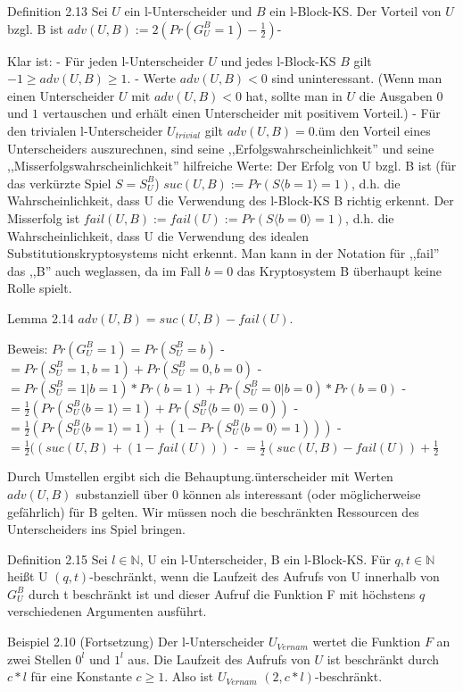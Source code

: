 \documentclass[a4paper]{article}
\begin{document}
\begin{multicols}{3}
    Definition 2.13 Sei $U$ ein l-Unterscheider und $B$ ein l-Block-KS. Der Vorteil von $U$ bzgl. B ist $adv(U,B):= 2(Pr(G^B_U=1)-\frac{1}{2})$-

    Klar ist:
    - Für jeden l-Unterscheider $U$ und jedes l-Block-KS $B$ gilt $-1\geq adv(U,B)\geq 1$.
    - Werte $adv(U,B)<0$ sind uninteressant. (Wenn man einen Unterscheider $U$ mit $adv(U,B)<0$ hat, sollte man in $U$ die Ausgaben $0$ und $1$ vertauschen und erhält einen Unterscheider mit positivem Vorteil.)
    - Für den trivialen l-Unterscheider $U_{trivial}$ gilt $adv(U,B) = 0$.üm den Vorteil eines Unterscheiders auszurechnen, sind seine ,,Erfolgswahrscheinlichkeit'' und seine ,,Misserfolgswahrscheinlichkeit'' hilfreiche Werte: Der Erfolg von U bzgl. B ist (für das verkürzte Spiel $S=S_U^B$) $suc(U,B) := Pr(S\langle b= 1\rangle = 1)$, d.h. die Wahrscheinlichkeit, dass U die Verwendung des l-Block-KS B richtig erkennt. Der Misserfolg ist $fail(U,B) := fail(U) := Pr(S\langle b= 0\rangle = 1)$, d.h. die Wahrscheinlichkeit, dass U die Verwendung des idealen Substitutionskryptosystems nicht erkennt. Man kann in der Notation für ,,fail'' das ,,B'' auch weglassen, da im Fall $b=0$ das Kryptosystem B überhaupt keine Rolle spielt.

    Lemma 2.14 $adv(U,B) = suc(U,B)-fail(U)$.

    Beweis: $Pr(G^B_U= 1) = Pr(S_U^B=b)$
    - $= Pr(S_U^B= 1,b= 1) + Pr(S_U^B= 0,b= 0)$
    - $= Pr(S_U^B= 1|b= 1)* Pr(b= 1) + Pr(S^B_U= 0|b= 0)*Pr(b= 0)$
    - $=\frac{1}{2}( Pr(S_U^B\langle b= 1\rangle = 1) + Pr(S_U^B\langle b= 0\rangle = 0))$
    - $=\frac{1}{2}( Pr(S_U^B\langle b= 1\rangle = 1) + (1-Pr(S_U^B\langle b= 0\rangle = 1)))$
    - $=\frac{1}{2}( (suc(U,B) + (1-fail(U)))$
    - $=\frac{1}{2}(suc(U,B)-fail(U)) + \frac{1}{2}$

    Durch Umstellen ergibt sich die Behauptung.ünterscheider mit Werten $adv(U,B)$ substanziell über 0 können als interessant (oder möglicherweise gefährlich) für B gelten. Wir müssen noch die beschränkten Ressourcen des Unterscheiders ins Spiel bringen.

    Definition 2.15 Sei $l\in\mathbb{N}$, U ein l-Unterscheider, B ein l-Block-KS. Für $q,t\in\mathbb{N}$ heißt U $(q,t)$-beschränkt, wenn die Laufzeit des Aufrufs von U innerhalb von $G^B_U$ durch t beschränkt ist und dieser Aufruf die Funktion F mit höchstens $q$ verschiedenen Argumenten ausführt.

    Beispiel 2.10 (Fortsetzung) Der l-Unterscheider $U_{Vernam}$ wertet die Funktion $F$ an zwei Stellen $0^l$ und $1^l$ aus. Die Laufzeit des Aufrufs von $U$ ist beschränkt durch $c*l$ für eine Konstante $c\geq 1$. Also ist $U_{Vernam}$ $(2,c*l)$-beschränkt.


\end{multicols}
\end{document}
